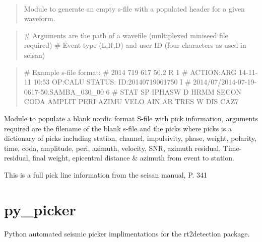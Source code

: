 \documentclass[letterpaper,10pt,english]{sphinxmanual}
\begin{document}
\begin{fulllineitems}
\label{modules:Sfile_util.blanksfile}~\begin{quote}

Module to generate an empty s-file with a populated header for a given
waveform.
\end{quote}
\begin{quote}

\# Arguments are the path of a wavefile (multiplexed miniseed file required)
\# Event type (L,R,D) and user ID (four characters as used in seisan)
\end{quote}
\begin{quote}

\# Example s-file format:
\# 2014  719  617 50.2 R                                                         1
\# ACTION:ARG 14-11-11 10:53 OP:CALU STATUS:               ID:20140719061750     I
\# 2014/07/2014-07-19-0617-50.SAMBA\_030\_00                                       6
\# STAT SP IPHASW D HRMM SECON CODA AMPLIT PERI AZIMU VELO AIN AR TRES W  DIS CAZ7
\end{quote}

\end{fulllineitems}


\begin{fulllineitems}
\label{modules:Sfile_util.populateSfile}
Module to populate a blank nordic format S-file with pick information,
arguments required are the filename of the blank s-file and the picks
where picks is a dictionary of picks including station, channel,
impulsivity, phase, weight, polarity, time, coda, amplitude, peri, azimuth,
velocity, SNR, azimuth residual, Time-residual, final weight,
epicentral distance \& azimuth from event to station.

This is a full pick line information from the seisan manual, P. 341

\end{fulllineitems}



\section{py\_picker}
\label{modules:module-py_picker}\label{modules:py-picker}
Python automated seismic picker implimentations for the rt2detection package.
\end{document}
